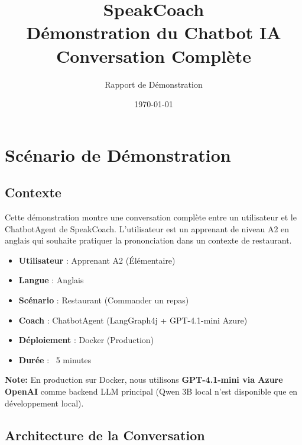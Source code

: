 \documentclass[12pt,a4paper,oneside]{report}
\title{\textbf{SpeakCoach}\\Démonstration du Chatbot IA\\Conversation Complète}
\author{Rapport de Démonstration}
\date{\today}
\begin{document}
\maketitle

\tableofcontents
\newpage

\chapter{Scénario de Démonstration}

\section{Contexte}

Cette démonstration montre une conversation complète entre un utilisateur et le ChatbotAgent 
de SpeakCoach. L'utilisateur est un apprenant de niveau A2 en anglais qui souhaite pratiquer 
la prononciation dans un contexte de restaurant.

\begin{itemize}
    \item \textbf{Utilisateur} : Apprenant A2 (Élémentaire)
    \item \textbf{Langue} : Anglais
    \item \textbf{Scénario} : Restaurant (Commander un repas)
    \item \textbf{Coach} : ChatbotAgent (LangGraph4j + GPT-4.1-mini Azure)
    \item \textbf{Déploiement} : Docker (Production)
    \item \textbf{Durée} : ~5 minutes
\end{itemize}

\textbf{Note:} En production sur Docker, nous utilisons \textbf{GPT-4.1-mini via Azure OpenAI} 
comme backend LLM principal (Qwen 3B local n'est disponible que en développement local).

\section{Architecture de la Conversation}
\end{document}
